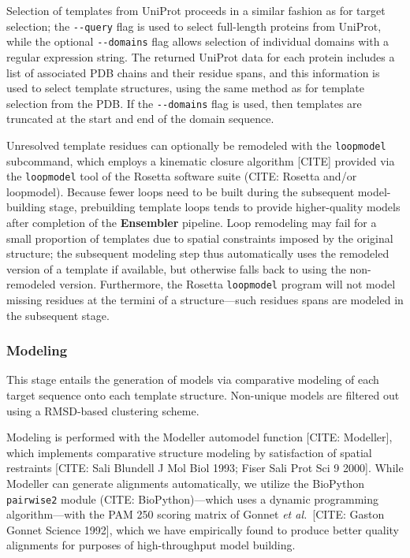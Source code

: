 \documentclass[aps,pre,twocolumn,nofootinbib,superscriptaddress,linenumbers]{revtex4-1}
\begin{document}
Selection of templates from UniProt proceeds in a similar fashion as for target selection; the {\tt -{}-query} flag is used to select full-length proteins from UniProt, while the optional {\tt -{}-domains} flag allows selection of individual domains with a regular expression string.
The returned UniProt data for each protein includes a list of associated PDB chains and their residue spans, and this information is used to select template structures, using the same method as for template selection from the PDB.
If the {\tt -{}-domains} flag is used, then templates are truncated at the start and end of the domain sequence.

Unresolved template residues can optionally be remodeled with the {\tt loopmodel} subcommand, which employs a kinematic closure algorithm {\color{red}[CITE]} provided via the {\tt loopmodel} tool of the Rosetta software suite (CITE: Rosetta and/or loopmodel).
Because fewer loops need to be built during the subsequent model-building stage, prebuilding template loops tends to provide higher-quality models after completion of the {\bf Ensembler} pipeline.
Loop remodeling may fail for a small proportion of templates due to spatial constraints imposed by the original structure; the subsequent modeling step thus automatically uses the remodeled version of a template if available, but otherwise falls back to using the non-remodeled version.
Furthermore, the Rosetta {\tt loopmodel} program will not model missing residues at the termini of a structure---such residues spans are modeled in the subsequent stage.

\subsubsection{Modeling}

This stage entails the generation of models via comparative modeling of each target sequence onto each template structure. Non-unique models are filtered out using a RMSD-based clustering scheme.

Modeling is performed with the Modeller automodel function {\color{red}[CITE: Modeller]}, which implements comparative structure modeling by satisfaction of spatial restraints {\color{red}[CITE: Sali Blundell J Mol Biol 1993; Fiser Sali Prot Sci 9 2000]}.
While Modeller can generate alignments automatically, we utilize the BioPython {\tt pairwise2} module (CITE: BioPython)---which uses a dynamic programming algorithm---with the PAM 250 scoring matrix of Gonnet \textit{et al.}~{\color{red}[CITE: Gaston Gonnet Science 1992]}, which we have empirically found to produce better quality alignments for purposes of high-throughput model building.
\end{document}
